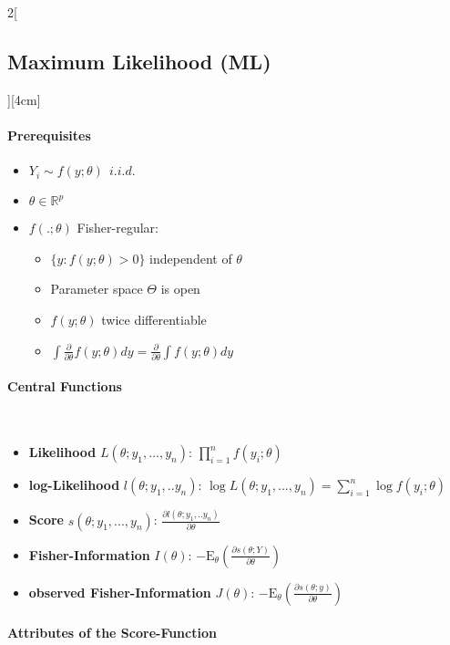 \documentclass[8pt]{extarticle}
\begin{document}
\begin{multicols}{2}[\subsection{Maximum Likelihood (ML)}][4cm]
  \paragraph{Prerequisites}
  
  \begin{itemize}
  \item $Y_i \sim f(y;\theta)\:\: i.i.d.$
  \item $\theta \in \mathbb{R}^p$
  \item $f(.;\theta)$ Fisher-regular:
  \begin{itemize}
  \item $\{ y: f (y; \theta)> 0 \}$ independent of $\theta$
  \item Parameter space $\Theta$ is open
  \item $f(y;\theta)$ twice differentiable
  \item $\int \frac{\partial}{\partial \theta} f(y;\theta)dy = \frac{\partial}{\partial \theta} \int f(y;\theta)dy$
  \end{itemize}
  \end{itemize}
  
  \paragraph{Central Functions} \ \\
  \begin{itemize}
  \item \textbf{Likelihood} $L(\theta;y_1,...,y_n)$: $\prod_{i=1}^n f(y_i;\theta)$
  \item \textbf{log-Likelihood} $l(\theta;y_1,..y_n)$: 
$\log L(\theta;y_1,...,y_n) = \sum_{i=1}^n \log f(y_i;\theta)$
  \item \textbf{Score} $s(\theta;y_1,...,y_n)$: $\frac{\partial l(\theta;y_1,..y_n)}{\partial \theta}$
  \item \textbf{Fisher-Information} $I(\theta)$: $-\mathrm{E}_\theta\left(\frac{\partial s(\theta;Y)}{\partial\theta}\right)$
  \item \textbf{observed Fisher-Information} $J(\theta)$: $-\mathrm{E}_\theta\left(\frac{\partial s(\theta;y)}{\partial\theta}\right)$
  \end{itemize}
  
  
  \paragraph{Attributes of the Score-Function} \ \\
  

\end{multicols}
\end{document}
